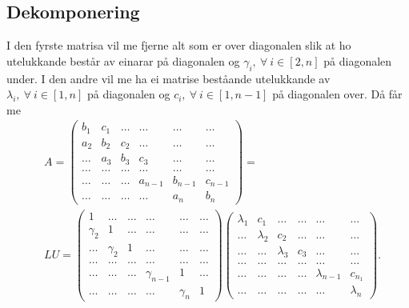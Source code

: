 \documentclass[11pt, a4paper]{article}
\begin{document}
  \subsection{Dekomponering}
    I den fyrste matrisa vil me fjerne alt som er over 
    diagonalen slik at ho utelukkande består av einarar på diagonalen og $\gamma_i, \ \forall \ i \in 
    [2, n]$ på diagonalen under. I den andre vil me ha ei matrise beståande utelukkande av $\lambda_i, \
    \forall \ i \in [1, n]$ på diagonalen og $c_i, \ \forall \ i \in [1, n-1]$ på diagonalen over. Då 
    får me
    \begin{equation*}
      \begin{align}
        &A =
        \begin{pmatrix}
          b_1 & c_1 & \dots & \dots & \dots & \dots \\
          a_2 & b_2 & c_2 & \dots & \dots & \dots \\
          \dots & a_3 & b_3 & c_3 & \dots & \dots \\
          \dots & \dots & \dots & \dots & \dots & \dots \\
          \dots & \dots & \dots & a_{n-1} & b_{n-1} & c_{n-1} \\
          \dots & \dots & \dots & \dots & a_n & b_n
        \end{pmatrix} = \\
        &LU =
        \begin{pmatrix}
          1 & \dots & \dots & \dots & \dots & \dots \\
          \gamma_2 & 1 & \dots & \dots & \dots & \dots \\
          \dots & \gamma_2 & 1 & \dots & \dots & \dots \\
          \dots & \dots & \dots & \dots & \dots & \dots \\
          \dots & \dots & \dots & \gamma_{n-1} & 1 & \dots \\
          \dots & \dots & \dots & \dots & \gamma_n & 1
        \end{pmatrix}
        \begin{pmatrix}
          \lambda_1 & c_1  & \dots & \dots & \dots & \dots \\
          \dots & \lambda_2 & c_2 & \dots & \dots & \dots \\
          \dots & \dots & \lambda_3 & c_3 & \dots & \dots \\
          \dots & \dots & \dots & \dots & \dots & \dots \\
          \dots & \dots & \dots & \dots & \lambda_{n-1} & c_{n_1} \\
          \dots & \dots & \dots & \dots & \dots & \lambda_n
        \end{pmatrix}.
      \end{align}
    \end{equation*}
\end{document}
